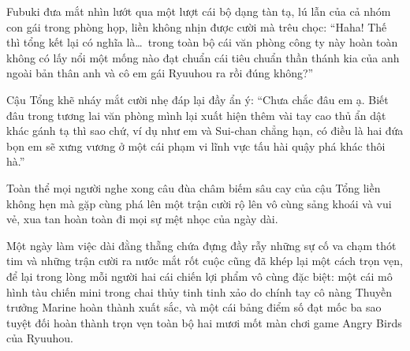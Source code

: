 \documentclass[../main.tex]{subfiles}
\begin{document}
Fubuki đưa mắt nhìn lướt qua một lượt cái bộ dạng tàn tạ, lú lẫn của cả nhóm con gái trong phòng họp, liền không nhịn được cười mà trêu chọc: ``Haha! Thế thì tổng kết lại có nghĩa là\dots\ trong toàn bộ cái văn phòng công ty này hoàn toàn không có lấy nổi một mống nào đạt chuẩn cái tiêu chuẩn thần thánh kia của anh ngoài bản thân anh và cô em gái Ryuuhou ra rồi đúng không?''

Cậu Tổng khẽ nháy mắt cười nhẹ đáp lại đầy ẩn ý: ``Chưa chắc đâu em ạ. Biết đâu trong tương lai văn phòng mình lại xuất hiện thêm vài tay cao thủ ẩn dật khác gánh tạ thì sao chứ, ví dụ như em và Sui-chan chẳng hạn, có điều là hai đứa bọn em sẽ xưng vương ở một cái phạm vi lĩnh vực tấu hài quậy phá khác thôi hà.''

Toàn thể mọi người nghe xong câu đùa châm biếm sâu cay của cậu Tổng liền không hẹn mà gặp cùng phá lên một trận cười rộ lên vô cùng sảng khoái và vui vẻ, xua tan hoàn toàn đi mọi sự mệt nhọc của ngày dài.

\il

Một ngày làm việc dài đằng thẵng chứa đựng đầy rẫy những sự cố va chạm thót tim và những trận cười ra nước mắt rốt cuộc cũng đã khép lại một cách trọn vẹn, để lại trong lòng mỗi người hai cái chiến lợi phẩm vô cùng đặc biệt: một cái mô hình tàu chiến mini trong chai thủy tinh tinh xảo do chính tay cô nàng Thuyền trưởng Marine hoàn thành xuất sắc, và một cái bảng điểm số đạt mốc ba sao tuyệt đối hoàn thành trọn vẹn toàn bộ hai mươi mốt màn chơi game Angry Birds của Ryuuhou.
\end{document}
